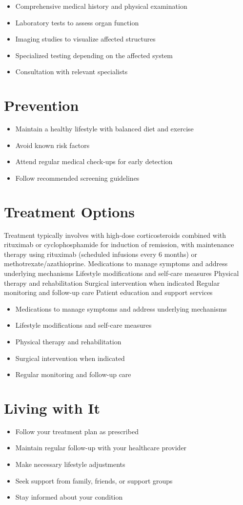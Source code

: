 \begin{itemize}[noitemsep]
  \item Comprehensive medical history and physical examination
  \item Laboratory tests to assess organ function
  \item Imaging studies to visualize affected structures
  \item Specialized testing depending on the affected system
  \item Consultation with relevant specialists
\end{itemize}
\section{Prevention}
\begin{itemize}[noitemsep]
  \item Maintain a healthy lifestyle with balanced diet and exercise
  \item Avoid known risk factors
  \item Attend regular medical check-ups for early detection
  \item Follow recommended screening guidelines
\end{itemize}
\section{Treatment Options}
Treatment typically involves with high-dose corticosteroids combined with rituximab or cyclophosphamide for induction of remission, with maintenance therapy using rituximab (scheduled infusions every 6 months) or methotrexate/azathioprine. Medications to manage symptoms and address underlying mechanisms Lifestyle modifications and self-care measures Physical therapy and rehabilitation Surgical intervention when indicated Regular monitoring and follow-up care Patient education and support services

\begin{itemize}[noitemsep]
  \item Medications to manage symptoms and address underlying mechanisms
  \item Lifestyle modifications and self-care measures
  \item Physical therapy and rehabilitation
  \item Surgical intervention when indicated
  \item Regular monitoring and follow-up care
\end{itemize}
\section{Living with It}
\begin{itemize}[noitemsep]
  \item Follow your treatment plan as prescribed
  \item Maintain regular follow-up with your healthcare provider
  \item Make necessary lifestyle adjustments
  \item Seek support from family, friends, or support groups
  \item Stay informed about your condition
\end{itemize}
